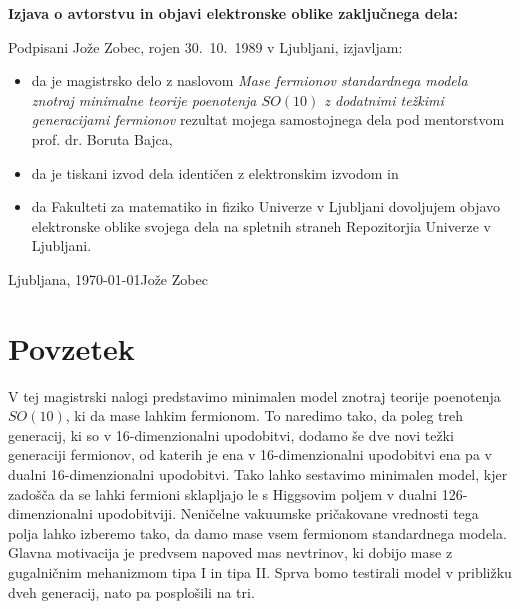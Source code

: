 \newpage

\thispagestyle{empty}

\centerline{}

\vfill

\centerline{\bf Izjava o avtorstvu in objavi elektronske oblike zaključnega dela:}

\bigskip
\bigskip

\noindent

Podpisani Jože Zobec, rojen 30.~10.~1989 v Ljubljani, izjavljam:
\begin{itemize}
\item{da je magistrsko delo z naslovom \emph{Mase fermionov standardnega modela znotraj minimalne teorije
	poenotenja 	$SO(10)$ z dodatnimi težkimi generacijami fermionov} rezultat mojega samostojnega dela
	pod mentorstvom prof. dr. Boruta Bajca,}
\item{da je tiskani izvod dela identičen z elektronskim izvodom in}
\item{da Fakulteti za matematiko in fiziko Univerze v Ljubljani dovoljujem objavo \\ elektronske oblike
	svojega dela na spletnih straneh Repozitorjia Univerze v Ljubljani.}
\end{itemize}
\bigskip
\bigskip
\noindent
Ljubljana, \today \hfill Jože Zobec
\vfill
\newpage
\thispagestyle{empty}
\null
\newpage


\thispagestyle{empty}
\vspace{5cm}
\section*{Povzetek}

V tej magistrski nalogi predstavimo minimalen model znotraj teorije poenotenja $SO(10)$, ki da mase lahkim
fermionom. To naredimo tako, da poleg treh generacij, ki so v 16-dimenzionalni upodobitvi, dodamo še dve novi
težki generaciji fermionov, od katerih je ena v 16-dimenzionalni upodobitvi ena pa v dualni 16-dimenzionalni
upodobitvi. Tako lahko sestavimo minimalen model, kjer zadošča da se lahki fermioni sklapljajo le s Higgsovim
poljem v dualni 126-dimenzionalni upodobitviji. Neničelne vakuumske pričakovane vrednosti tega polja lahko
izberemo tako, da damo mase vsem fermionom standardnega modela. Glavna motivacija je predvsem napoved mas
nevtrinov, ki dobijo mase z gugalničnim mehanizmom tipa I in tipa II. Sprva bomo testirali model v približku
dveh generacij, nato pa posplošili na tri.

\vspace{10pt}
